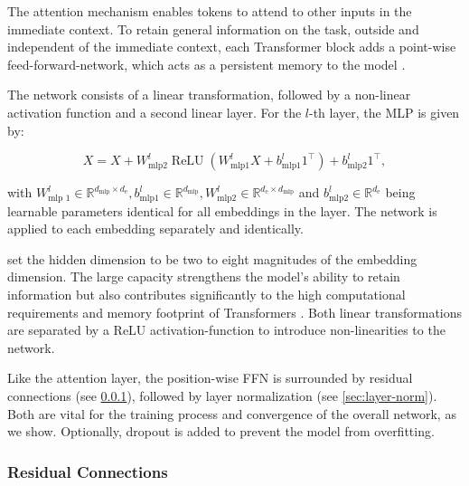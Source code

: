 The attention mechanism enables tokens to attend to other inputs in the immediate context. To retain general information on the task, outside and independent of the immediate context, each Transformer block adds a point-wise \gls{feed-forward-network}, which acts as a persistent memory to the model \autocite[][3]{sukhbaatarAugmentingSelfattentionPersistent2019}.

The network consists of a linear transformation, followed by a non-linear activation function and a second linear layer. For the $l$-th layer, the \gls{MLP} is given by:

\begin{equation}
  X = X+W_{\mathrm{mlp} 2}^l \operatorname{ReLU}\left(W_{\mathrm{mlp} 1}^l X+b_{\mathrm{mlp} 1}^l 1^{\top}\right)+b_{\mathrm{mlp} 2}^l 1^{\top},
\end{equation}

with $W_{\text {mlp } 1}^l \in \mathbb{R}^{d_{\mathrm{mlp}} \times d_{\mathrm{e}}}, b_{\mathrm{mlp} 1}^l \in \mathbb{R}^{d_{\mathrm{mlp}}}, W_{\mathrm{mlp} 2}^l \in \mathbb{R}^{d_{\mathrm{e}} \times d_{\mathrm{mlp}}}$ and $b_{\mathrm{mlp} 2}^l \in \mathbb{R}^{d_{\mathrm{e}}}$ being learnable parameters identical for all \glspl{embedding} in the layer. The network is applied to each embedding separately and identically.

\textcite[][9]{vaswaniAttentionAllYou2017} set the hidden dimension to be two to eight magnitudes of the embedding dimension. The large capacity strengthens the model's ability to retain information but also contributes significantly to the high computational requirements and memory footprint of Transformers \autocites[][5]{tayEfficientTransformersSurvey2022}[][1]{kitaevReformerEfficientTransformer2020}. Both linear transformations are separated by a \gls{ReLU} \gls{activation-function} \autocite[][318]{glorotDeepSparseRectifier2011} to introduce non-linearities to the network.

Like the attention layer, the position-wise \gls{FFN} is surrounded by residual connections (see \cref{sec:residual-connections}), followed by layer normalization (see \cref{sec:layer-norm}). Both are vital for the training process and convergence of the overall network, as we show. Optionally, dropout \autocite[][1930]{srivastavaDropoutSimpleWay} is added to prevent the model from \gls{overfitting}.

\subsubsection{Residual Connections}\label{sec:residual-connections}

